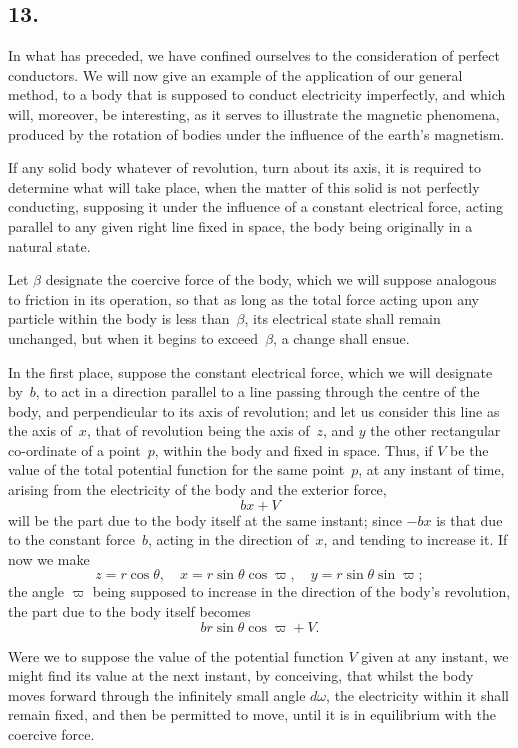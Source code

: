 \documentclass[11pt,notitlepage]{amsart}
\newcommand\Section[1]{\subsection{{#1}}}
\begin{document}
\Section{13.}
In what has preceded, we have confined ourselves to the consideration
of perfect conductors. We will now give an example of the application of
our general method, to a body that is supposed to conduct electricity 
imperfectly, and which will, moreover,
be interesting, as it serves to illustrate the
magnetic phenomena, produced by the rotation of bodies under the influence
of the earth's magnetism.

If any solid body whatever of revolution, turn about its axis, it is
required to determine what will take place, when the matter of this solid is
not perfectly conducting,
supposing it under the influence of a constant electrical
force, acting parallel to any given right line fixed in space, the body being
originally in a natural state.

Let $\beta$ designate the coercive force of the body, which we will suppose
analogous to friction in its operation,
so that as long as the total force acting
upon any particle within the body is less than~$\beta$,
its electrical state shall
remain unchanged, but when it begins to exceed~$\beta$, a change shall ensue.

In the first place, suppose the constant electrical force, which we will
designate by~$b$, to act in a direction parallel to a line passing through the
centre of the body, and perpendicular to its axis of revolution; and let us
consider this line as the axis of~$x$,
that of revolution being the axis of~$z$,
and $y$ the other rectangular co-ordinate of a point~$p$, within the body and
fixed in space. Thus, if $V$ be the value of the total potential function for
the same point~$p$, at any instant of time, arising from the electricity of the
body and the exterior force,
\[
bx+V
\]
will be the part due to the body itself at the same instant; since $-bx$ is
that due to the constant force~$b$, acting in the direction of~$x$, and tending
to increase it. If now we make
\[
z=r\cos\theta,\quad
x=r\sin\theta\cos\varpi,\quad
y=r\sin\theta\sin\varpi;
\]
the angle $\varpi$ being supposed to increase
in the direction of the body's revolution,
the part due to the body itself becomes
\[
br\sin\theta\cos\varpi+V.
\]

Were we to suppose the value of the potential function $V$ given at
any instant, we might find its value at the next instant, by conceiving, that
whilst the body moves forward through the infinitely small angle $d\omega$, the
electricity within it shall remain fixed, and then be permitted to move, until
it is in equilibrium with the coercive force.
\end{document}
